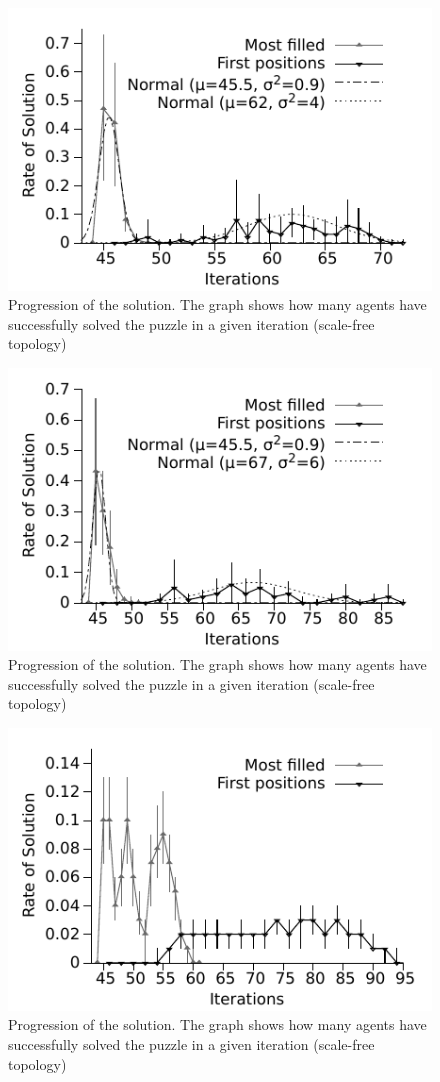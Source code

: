 \documentclass{article}
\begin{document}
\begin{figure}
\includegraphics[scale=1]{ijcai_sudoku/ring}
\caption{Progression of the solution. The graph shows how many agents have successfully solved the puzzle in a given iteration (scale-free topology)}
\label{fig:ring_gauss}
\end{figure}

\begin{figure}
\includegraphics[scale=1]{ijcai_sudoku/sf}
\caption{Progression of the solution. The graph shows how many agents have successfully solved the puzzle in a given iteration (scale-free topology)}
\label{fig:sf_gauss}
\end{figure}

\begin{figure}
\includegraphics[scale=1]{ijcai_sudoku/geral}
\caption{Progression of the solution. The graph shows how many agents have successfully solved the puzzle in a given iteration (scale-free topology)}
\label{fig:global_gauss}
\end{figure}
\end{document}
